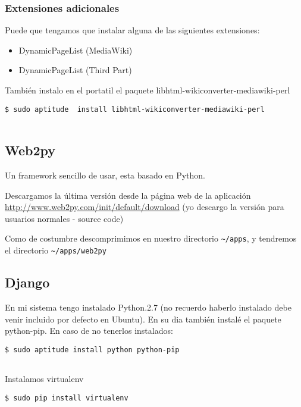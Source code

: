 \subsubsection{Extensiones adicionales}\label{extensiones-adicionales}

Puede que tengamos que instalar alguna de las siguientes extensiones:

\begin{itemize}
\item
  DynamicPageList (MediaWiki)
\item
  DynamicPageList (Third Part)
\end{itemize}

También instalo en el portatil el paquete
libhtml-wikiconverter-mediawiki-perl

\begin{verbatim}
$ sudo aptitude  install libhtml-wikiconverter-mediawiki-perl
        
\end{verbatim}

\subsection{Web2py}\label{web2py}

Un framework sencillo de usar, esta basado en Python.

Descargamos la última versión desde la página web de la aplicación
\url{http://www.web2py.com/init/default/download} (yo descargo la
versión para usuarios normales - source code)

Como de costumbre descomprimimos en nuestro directorio
\texttt{\textasciitilde{}/apps}, y tendremos el directorio
\texttt{\textasciitilde{}/apps/web2py}

\subsection{Django}\label{django}

En mi sistema tengo instalado Python.2.7 (no recuerdo haberlo instalado
debe venir incluido por defecto en Ubuntu). En su dia también instalé el
paquete python-pip. En caso de no tenerlos instalados:

\begin{verbatim}
$ sudo aptitude install python python-pip
      
\end{verbatim}

Instalamos virtualenv

\begin{verbatim}
$ sudo pip install virtualenv
      
\end{verbatim}

